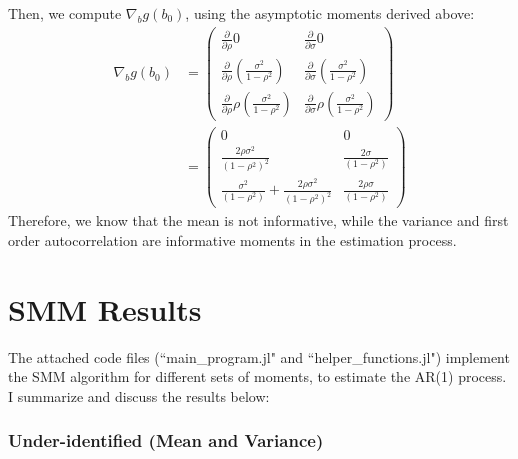 \documentclass[12pt]{article}
\begin{document}
\clearpage
Then, we compute $\nabla_b g(b_0)$, using the asymptotic moments derived above: 
\begin{align*}
	\nabla_b g(b_0) &= \begin{pmatrix} \frac{\partial}{\partial \rho}0  & \frac{\partial}{\partial \sigma}0 \\  \frac{\partial}{\partial \rho} (\frac{\sigma^2}{1-\rho^2}) & \frac{\partial}{\partial \sigma} (\frac{\sigma^2}{1-\rho^2}) \\ \frac{\partial}{\partial \rho}   \rho (\frac{\sigma^2}{1-\rho^2}) & \frac{\partial}{\partial \sigma}  \rho (\frac{\sigma^2}{1-\rho^2})\end{pmatrix} \\
	&= \begin{pmatrix} 0 & 0 \\ \frac{2\rho \sigma^2}{(1-\rho^2)^2} &  \frac{2 \sigma}{(1-\rho^2)} \\ \frac{\sigma^2}{(1-\rho^2)} + \frac{2\rho \sigma^2}{(1-\rho^2)^2} & \frac{2\rho \sigma}{(1-\rho^2)} \end{pmatrix}
\end{align*}
Therefore, we know that the mean is not informative, while the variance and first order autocorrelation are informative moments in the estimation process.

\section*{SMM Results} 
The attached code files (``main\_program.jl" and ``helper\_functions.jl") implement the SMM algorithm for different sets of moments, to estimate the AR(1) process. I summarize and discuss the results below: 

\subsubsection*{Under-identified (Mean and Variance)} 
\end{document}
